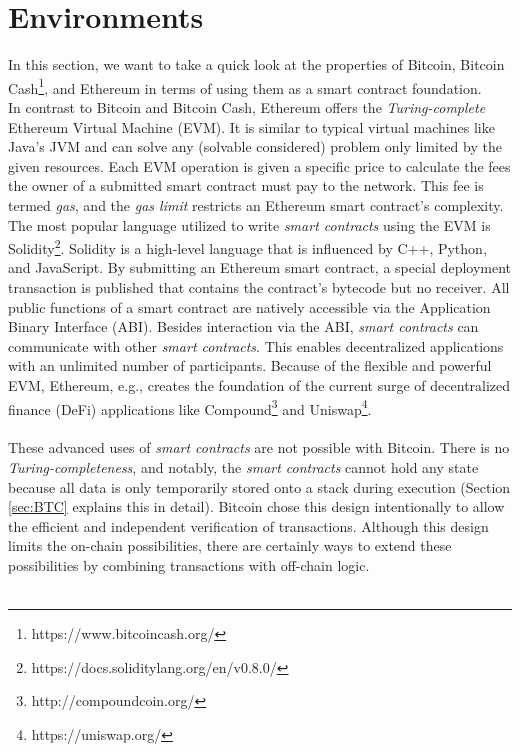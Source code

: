 \documentclass{cacthesis}
\begin{document}
        \section{Environments}
        \label{sec:smartContractOptions}
        In this section, we want to take a quick look at the properties of Bitcoin, Bitcoin Cash\footnote{https://www.bitcoincash.org/}, and Ethereum in terms of using them as a smart contract foundation. \\
        In contrast to Bitcoin and Bitcoin Cash, Ethereum offers the \textit{Turing-complete} Ethereum Virtual Machine (EVM). It is similar to typical virtual machines like Java's JVM and can solve any (solvable considered) problem only limited by the given resources. Each EVM operation is given a specific price to calculate the fees the owner of a submitted smart contract must pay to the network. This fee is termed \textit{gas}, and the \textit{gas limit} restricts an Ethereum smart contract's complexity. The most popular language utilized to write \textit{smart contracts} using the EVM is Solidity\footnote{https://docs.soliditylang.org/en/v0.8.0/}. Solidity is a high-level language that is influenced by C++, Python, and JavaScript. By submitting an Ethereum smart contract, a special deployment transaction is published that contains the contract's bytecode but no receiver. All public functions of a smart contract are natively accessible via the Application Binary Interface (ABI). Besides interaction via the ABI, \textit{smart contracts} can communicate with other \textit{smart contracts}. This enables decentralized applications with an unlimited number of participants. Because of the flexible and powerful EVM, Ethereum, e.g., creates the foundation of the current surge of decentralized finance (DeFi) applications like Compound\footnote{http://compoundcoin.org/} and Uniswap\footnote{https://uniswap.org/}. \\\\ 
        These advanced uses of \textit{smart contracts} are not possible with Bitcoin. There is no \textit{Turing-completeness}, and notably, the \textit{smart contracts} cannot hold any state because all data is only temporarily stored onto a stack during execution (Section \ref{sec:BTC} explains this in detail). Bitcoin chose this design intentionally to allow the efficient and independent verification of transactions. Although this design limits the on-chain possibilities, there are certainly ways to extend these possibilities by combining transactions with off-chain logic. \\\\ 
\end{document}

